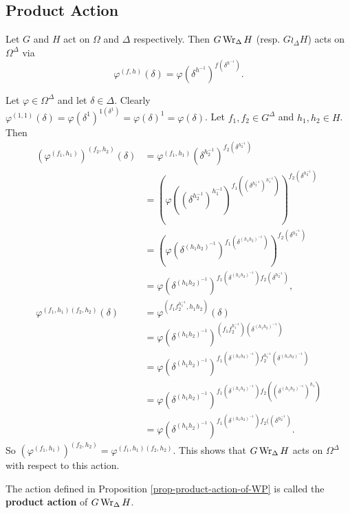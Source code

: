 \subsection{Product Action}
\begin{proposition} \label{prop-product-action-of-WP}
	Let $G$ and $H$ act on $\Omega$ and $\Delta$ respectively. Then $G\operatorname{Wr}_\Delta H$ (resp. $G\wr_\Delta H$) acts on $\Omega^\Delta$ via
	\begin{equation*}
	\varphi^{(f,h)}(\delta) = \varphi(\delta^{h^{-1}})^{f(\delta^{h^{-1}})}.
	\end{equation*} 
\end{proposition}
\begin{sketch}
	Let $\varphi\in \Omega^\Delta$ and let $\delta\in \Delta$. 
	Clearly $\varphi^{(1,1)}(\delta) = \varphi(\delta^{1})^{1(\delta^{1})} = \varphi(\delta)^{1} = \varphi(\delta)$. Let $f_1,f_2\in G^\Delta$ and $h_1,h_2\in H$. Then  
	\begin{align*}
		(\varphi^{(f_1,h_1)})^{(f_2,h_2)}(\delta) &= \varphi^{(f_1,h_1)}(\delta^{h_2^{-1}})^{f_2(\delta^{h_2^{-1}})}
		\\
		&= (\varphi((\delta^{h_2^{-1}})^{h_1^{-1}})^{f_1((\delta^{h_2^{-1}})^{h_1^{-1}})})^{f_2(\delta^{h_2^{-1}})}
		\\
		&= (\varphi(\delta^{(h_1h_2)^{-1}})^{f_1(\delta^{(h_1h_2)^{-1}})})^{f_2(\delta^{h_2^{-1}})}
		\\
		&= \varphi(\delta^{(h_1h_2)^{-1}})^{f_1(\delta^{(h_1h_2)^{-1}})f_2(\delta^{h_2^{-1}})},
		\\
\varphi^{(f_1,h_1)(f_2,h_2)}(\delta)&= \varphi^{(f_1f_2^{h_1^{-1}},h_1h_2)}(\delta)
\\
&= \varphi(\delta^{(h_1h_2)^{-1}})^{(f_1f_2^{h_1^{-1}})(\delta^{(h_1h_2)^{-1}})}
\\
&= \varphi(\delta^{(h_1h_2)^{-1}})^{f_1(\delta^{(h_1h_2)^{-1}})f_2^{h_1^{-1}}(\delta^{(h_1h_2)^{-1}})}
\\
&= \varphi(\delta^{(h_1h_2)^{-1}})^{f_1(\delta^{(h_1h_2)^{-1}})f_2((\delta^{(h_1h_2)^{-1}})^{h_1})}
\\
&= \varphi(\delta^{(h_1h_2)^{-1}})^{f_1(\delta^{(h_1h_2)^{-1}})f_2((\delta^{h_2^{-1}})}.
\end{align*}
	So $(\varphi^{(f_1,h_1)})^{(f_2,h_2)}  =\varphi^{(f_1,h_1)(f_2,h_2)}$. This shows that $G\operatorname{Wr}_{\Delta} H$ acts on $\Omega^\Delta$ with respect to this action.
\end{sketch}
\begin{definition}
	The action defined in Proposition \ref{prop-product-action-of-WP} is called the \textbf{product action} of $G\operatorname{Wr}_{\Delta} H$.
\end{definition}
